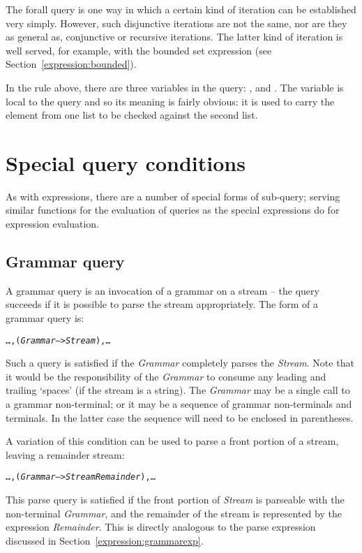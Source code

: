The forall query is one way in which a certain kind of iteration can be established very simply. However, such disjunctive iterations are not the same, nor are they as general as, conjunctive or recursive iterations. The latter kind of iteration is well served, for example, with the bounded set expression (see Section~\vref{expression:bounded}).

\begin{aside}
In the  rule above, there are three variables in the \q{*>} query: ,  and . The  variable is local to the \q{*>} query and so its meaning is fairly obvious: it is used to carry the element from one list to be checked against the second list.

\end{aside}

\section{Special query conditions}
\label{goals:special}

As with expressions, there are a number of special forms of sub-query; serving similar functions for the evaluation of queries as the special expressions do for expression evaluation.

\subsection{Grammar query}
\label{goal:grammar}

A grammar query is an invocation of a grammar on a stream -- the query succeeds if it is possible to parse the stream appropriately. The form of a grammar query is:
\begin{alltt}
\ldots,(\emph{Grammar} --> \emph{Stream}),\ldots
\end{alltt}
Such a query is satisfied if the \emph{Grammar} completely parses the \emph{Stream}. Note that it would be the responsibility of the \emph{Grammar} to consume any leading and trailing `spaces' (if the stream is a string). The \emph{Grammar} may be a single call to a grammar non-terminal; or it may be a sequence of grammar non-terminals and terminals. In the latter case the sequence will need to be enclosed in parentheses.

A variation of this condition can be used to parse a front portion of a stream, leaving a remainder stream:
\begin{alltt}
\ldots,(\emph{Grammar} --> \emph{Stream}\tilda{}\emph{Remainder}),\ldots
\end{alltt}
This parse query is satisfied if the front portion of \emph{Stream} is parseable with the non-terminal \emph{Grammar}, and the remainder of the stream is represented by the expression \emph{Remainder}. This is directly analogous to the parse expression discussed in Section~\vref{expression:grammarexp}.


